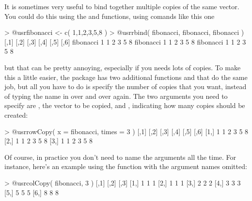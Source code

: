 
It is sometimes very useful to bind together multiple copies of the same vector. You could do this using the  and  functions, using comands like this one
\begin{rblock1}
> @usr{fibonacci <- c( 1,1,2,3,5,8 )}
> @usr{rbind( fibonacci, fibonacci, fibonacci )}
          [,1] [,2] [,3] [,4] [,5] [,6]
fibonacci    1    1    2    3    5    8
fibonacci    1    1    2    3    5    8
fibonacci    1    1    2    3    5    8
\end{rblock1}
but that can be pretty annoying, especially if you needs lots of copies. To make this a little easier, the  package has two additional functions  and  that do the same job, but all you have to do is specify the number of copies that you want, instead of typing the name in over and over again. The two arguments you need to specify are , the vector to be copied, and , indicating how many copies should be created:
\begin{rblock1}
> @usr{rowCopy( x = fibonacci, times = 3 )}
     [,1] [,2] [,3] [,4] [,5] [,6]
[1,]    1    1    2    3    5    8
[2,]    1    1    2    3    5    8
[3,]    1    1    2    3    5    8
\end{rblock1}
Of course, in practice you don't need to name the arguments all the time. For instance, here's an example using the  function with the argument names omitted:
\begin{rblock1}
> @usr{colCopy( fibonacci, 3 )}
     [,1] [,2] [,3]
[1,]    1    1    1
[2,]    1    1    1
[3,]    2    2    2
[4,]    3    3    3
[5,]    5    5    5
[6,]    8    8    8
\end{rblock1}


